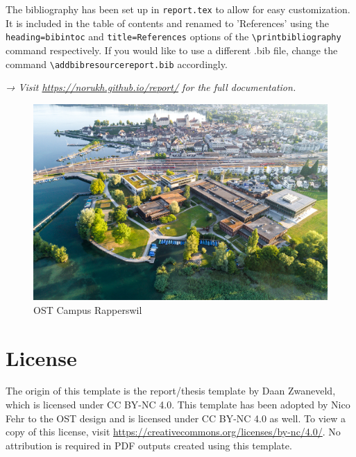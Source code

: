 The bibliography has been set up in \texttt{report.tex} to allow for easy customization. It is included in the table of contents and renamed to 'References' using the \texttt{heading=bibintoc} and \texttt{title=References} options of the \texttt{\textbackslash printbibliography} command respectively. If you would like to use a different .bib file, change the command \texttt{\textbackslash addbibresource{report.bib}} accordingly.

\emph{→ Visit \url{https://norukh.github.io/report/} for the full documentation.}

\begin{figure}[h]
  \centering
  \includegraphics[width=0.95\linewidth]{figures/ost-campus-rj.jpg}
  \caption{OST Campus Rapperswil}
\end{figure}

\section*{License}

The origin of this template is the report/thesis template by Daan Zwaneveld, which is licensed under CC BY-NC 4.0.
This template has been adopted by Nico Fehr to the OST design and is licensed under CC BY-NC 4.0 as well. To view a copy of this license, visit \url{https://creativecommons.org/licenses/by-nc/4.0/}. No attribution is required in PDF outputs created using this template.